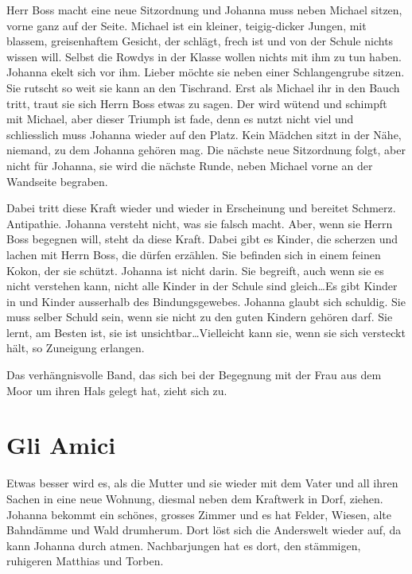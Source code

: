 \documentclass[10pt,titlepage,a5paper]{book}
\begin{document}
Herr Boss macht eine neue Sitzordnung und Johanna muss neben Michael sitzen, vorne ganz auf der Seite. Michael ist ein kleiner, teigig-dicker Jungen, mit blassem, greisenhaftem Gesicht, der schlägt, frech ist und von der Schule nichts wissen will. Selbst die Rowdys in der Klasse wollen nichts mit ihm zu tun haben. Johanna ekelt sich vor ihm. Lieber möchte sie neben einer Schlangengrube sitzen. Sie rutscht so weit sie kann an den Tischrand. Erst als Michael ihr in den Bauch tritt, traut sie sich Herrn Boss etwas zu sagen. Der wird wütend und schimpft mit Michael, aber dieser Triumph ist fade, denn es nutzt nicht viel und schliesslich muss Johanna wieder auf den Platz. Kein Mädchen sitzt in der Nähe, niemand, zu dem Johanna gehören mag. Die nächste neue Sitzordnung folgt, aber nicht für Johanna, sie wird die nächste Runde, neben Michael vorne an der Wandseite begraben.

Dabei tritt diese Kraft wieder und wieder in Erscheinung und bereitet Schmerz. Antipathie. Johanna versteht nicht, was sie falsch macht. Aber, wenn sie Herrn Boss begegnen will, steht da diese Kraft. Dabei gibt es Kinder, die scherzen und lachen mit Herrn Boss, die dürfen erzählen. Sie befinden sich in einem feinen Kokon, der sie schützt. Johanna ist nicht darin. Sie begreift, auch wenn sie es nicht verstehen kann, nicht alle Kinder in der Schule sind gleich\dots Es gibt Kinder in und Kinder ausserhalb des Bindungsgewebes. Johanna glaubt sich schuldig. Sie muss selber Schuld sein, wenn sie nicht zu den guten Kindern gehören darf. Sie lernt, am Besten ist, sie ist unsichtbar\dots Vielleicht kann sie, wenn sie sich versteckt hält, so Zuneigung erlangen.

Das verhängnisvolle Band, das sich bei der Begegnung mit der Frau aus dem Moor um ihren Hals gelegt hat, zieht sich zu.



\section*{ Gli Amici}




Etwas besser wird es, als die Mutter und sie wieder mit dem Vater und all ihren Sachen in eine neue Wohnung, diesmal neben dem Kraftwerk in Dorf, ziehen. Johanna bekommt ein schönes, grosses Zimmer und es hat Felder, Wiesen, alte Bahndämme und Wald drumherum. Dort löst sich die Anderswelt wieder auf, da kann Johanna durch atmen. Nachbarjungen hat es dort, den stämmigen, ruhigeren Matthias und Torben. 
\end{document}
